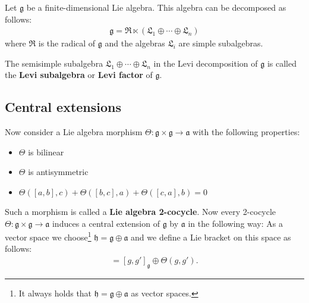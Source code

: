         \begin{theorem}
        	Let $\mathfrak{g}$ be a finite-dimensional Lie algebra. This algebra can be decomposed as follows:
        	\begin{gather}
        		\mathfrak{g} = \mathfrak{R} \ltimes (\mathfrak{L}_1 \oplus \cdots \oplus \mathfrak{L}_n)
        	\end{gather}
        	where $\mathfrak{R}$ is the radical of $\mathfrak{g}$ and the algebras $\mathfrak{L}_i$ are simple subalgebras.
        \end{theorem}
        \begin{definition}
		The semisimple subalgebra $\mathfrak{L}_1 \oplus \cdots \oplus \mathfrak{L}_n$ in the Levi decomposition of $\mathfrak{g}$ is called the \textbf{Levi subalgebra} or \textbf{Levi factor} of $\mathfrak{g}$.
        \end{definition}

\subsection{Central extensions}\label{section:central_extension_algebra}

	
	Now consider a Lie algebra morphism $\Theta:\mathfrak{g}\times\mathfrak{g}\rightarrow\mathfrak{a}$ with the following properties:
	\begin{itemize}
		\item $\Theta$ is bilinear
		\item $\Theta$ is antisymmetric
		\item $\Theta([a, b], c) + \Theta([b, c], a) + \Theta([c, a], b) = 0$
	\end{itemize}
	Such a morphism is called a \textbf{Lie algebra 2-cocycle}. Now every 2-cocycle $\Theta:\mathfrak{g}\times\mathfrak{g}\rightarrow\mathfrak{a}$ induces a central extension of $\mathfrak{g}$ by $\mathfrak{a}$ in the following way: As a vector space we choose\footnote{It always holds that $\mathfrak{h}=\mathfrak{g}\oplus\mathfrak{a}$ as vector spaces.} $\mathfrak{h}=\mathfrak{g}\oplus\mathfrak{a}$ and we define a Lie bracket on this space as follows:
	\begin{gather}
		[g\oplus\lambda, g'\oplus\mu] = [g, g']_{\mathfrak{g}} \oplus \Theta(g, g').
	\end{gather}

